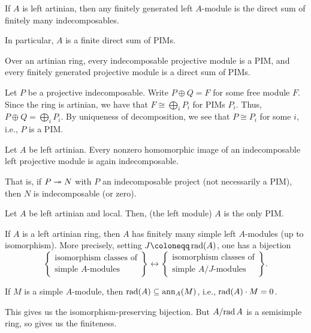 \documentclass[12pt]{article}
\begin{document}
\begin{thm}
	If $A$ is left artinian, then any finitely generated left $A$-module is the direct sum of finitely many indecomposables. 

	In particular, $A$ is a finite direct sum of PIMs.
\end{thm}
\begin{thm}
	Over an artinian ring, every indecomposable projective module is a PIM, 
	and every finitely generated projective module is a direct sum of PIMs.
\end{thm}
\begin{sketch}
	Let $P$ be a projective indecomposable. 
	Write $P \oplus Q = F$ for some free module $F$.
	Since the ring is artinian, we have that $F \cong \bigoplus_{i} P_{i}$ for PIMs $P_{i}$. 
	Thus, $P \oplus Q = \bigoplus_{i} P_{i}$. 
	By uniqueness of decomposition, we see that $P \cong P_{i}$ for some $i$, i.e., 
	$P$ is a PIM.
\end{sketch}

\begin{thm}
	Let $A$ be left artinian. 
	Every nonzero homomorphic image of an indecomposable left projective module is again indecomposable.

	That is, if $P \twoheadrightarrow N$ with $P$ an indecomposable project (not necessarily a PIM), then $N$ is indecomposable (or zero).
\end{thm}

\begin{thm}
	Let $A$ be left artinian and local.
	Then, (the left module) $A$ is the only PIM.
\end{thm}

\begin{thm}
	If $A$ is a left artinian ring, then $A$ has finitely many simple left $A$-modules (up to isomorphism). 
	More precisely, setting $J \coloneqq \rad(A)$, one has a bijection
	\begin{equation*} 
		\left\{
			\begin{array}{c}
				\text{isomorphism classes of}\\
				\text{simple $A$-modules}
			\end{array}
		\right\}
		\leftrightarrow 
		\left\{
			\begin{array}{c}
				\text{isomorphism classes of}\\
				\text{simple $A/J$-modules}
			\end{array}
		\right\}.
	\end{equation*}
\end{thm}
\begin{sketch}
	If $M$ is a simple $A$-module, then $\operatorname{rad}(A) \subseteq \operatorname{ann}_{A}(M)$, i.e., $\operatorname{rad}(A) \cdot M = 0$. 

	This gives us the isomorphism-preserving bijection. 
	But $A/{\operatorname{rad} A}$ is a semisimple ring, so 
	 gives us the finiteness.
\end{sketch}
\end{document}
